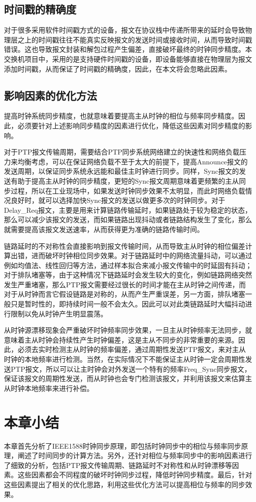 \subsection{时间戳的精确度}
\label{sec:1588_problem_2}
对于很多采用软件时间戳方式的设备，报文在协议栈中传递所带来的延时会导致物理层之上的时间戳往往不能真实反映报文的发送时间或接收时间，从而导致时间戳错误\supercite{53}。这也导致报文封装和解包过程产生偏差，直接破坏最终的时钟同步精度。本交换机项目中，采用的是支持硬件时间戳的设备，即设备能够直接在物理层为报文添加时间戳，从而保证了时间戳的精确度，因此，在本文将会忽略此因素。

\subsection{影响因素的优化方法}
提高时钟系统同步精度，也就意味着要提高主从时钟的相位与频率同步精度。因此，必须要针对上述影响同步精度的因素进行优化，降低这些因素对同步精度的影响。

对于PTP报文传输周期，需要结合PTP同步系统网络建立的快速性和网络负载压力来均衡考虑，可以在保证网络负载不至于太大的前提下，提高Announce报文的发送周期，以保证同步系统永远能和最佳主时钟进行同步。同样，Sync报文的发送有助于提高主从时钟的同步精度，更短的Sync报文周期意味着更频繁的主从同步过程，所以在工业现场中，如果发送时钟同步效果不太明显，而此时网络负载情况良好时，就可以选择加快Sync报文的发送以做更多次的时钟同步。对于Delay\_Req报文，主要是用来计算链路传输延时，如果链路处于较为稳定的状态，那么可以减少该报文的发送，而如果链路出现抖动或者链路结构发生了变化，那么就需要提高该报文发送速率，从而获得更为准确的链路传输时间。

链路延时的不对称性会直接影响到报文传输时间，从而导致主从时钟的相位偏差计算出错，进而破坏时钟相位同步效果。对于链路延时中的网络流量抖动，可以通过例如均值法、线性回归等方法，通过样本拟合来减小报文传输中的时延固有抖动；对于排队堵塞等，由于这种情况下链路延时会发生较大的变化，例如链路网络突然发生严重堵塞，那么PTP报文需要经过很长的时间才能在主从时钟之间传递，而对于从时钟而言它假设链路是对称的，从而产生严重误差，另一方面，排队堵塞一般只是暂时性的，即持续时间一般不会太久。因此可以对此类链路延时大幅抖动进行限制以免从时钟产生明显震荡。

从时钟源漂移现象会严重破坏时钟频率同步效果，一旦主从时钟频率无法同步，就意味着主从时钟会持续性产生时钟偏差，这是主从不同步的非常重要的来源。因此，必须去实时检测主从时钟的频率偏差，通过周期性发送PTP报文，来对主从时钟的本地频率进行检测。当然，在实际情况下不能保证主从时钟一定会周期性发送PTP报文，所以可以让主时钟会对外发送一个特有的频率Freq\_Sync同步报文，保证该报文的周期性发送，而从时钟也会专门检测该报文，并利用该报文来估算主从时钟本地频率来进行补偿。

\section{本章小结}
本章首先分析了IEEE1588时钟同步原理，即包括时钟同步中的相位与频率同步原理，阐述了时间同步的计算方法。另外，还针对相位与频率同步中的影响因素进行了细致的分析，包括PTP报文传输周期、链路延时不对称性和从时钟漂移等因素。这些因素都会不同程度的破坏时钟同步过程，降低时钟同步精度。最后，针对这些因素提出了相关的优化思路，利用这些优化方法可以提高相位与频率的同步效果。
